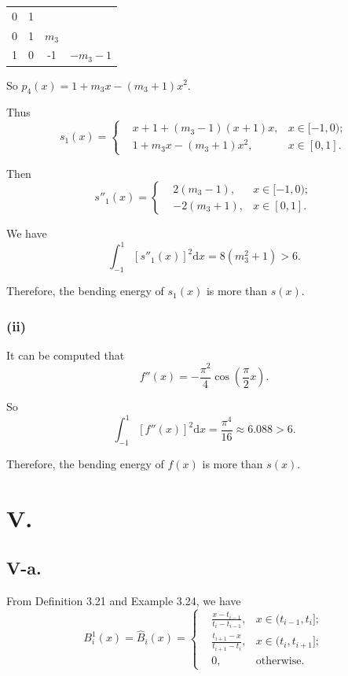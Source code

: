 \documentclass[a4paper]{article}
\begin{document}
\begin{table}[H]
  \centering
  \begin{tabular}{c|ccc}
    0 & 1 & &  \\
    0 & 1 & $m_3$ &   \\
    1 & 0 & -1 & $-m_3-1$  \\
  \end{tabular}
\end{table}

So $p_4(x)=1+m_{3}x-(m_3+1)x^2$.

Thus 
$$
s_1(x)=
\left\{
\begin{aligned}
  &x+1+(m_3-1)(x+1)x, &x\in [-1,0);\\
  &1+m_{3}x-(m_3+1)x^2, &x\in [0,1].
\end{aligned}
\right.
$$

Then
$$
s''_1(x)=
\left\{
\begin{aligned}
  &2(m_3-1), &x\in [-1,0);\\
  &-2(m_3+1), &x\in [0,1].
\end{aligned}
\right.
$$

We have 
$$
\int_{-1}^{1}[s''_1(x)]^2 \mathrm{d}x=8(m_3^2+1)>6.
$$

Therefore, the bending energy of $s_1(x)$ is more than $s(x)$.

\subsubsection*{(ii)}
It can be computed that $$f''(x)=-\frac{\pi^2}{4}\cos(\frac{\pi}{2}x).$$

So $$\int_{-1}^{1}[f''(x)]^2 \mathrm{d}x=\frac{\pi^4}{16}\approx6.088>6.$$

Therefore, the bending energy of $f(x)$ is more than $s(x)$.

\section*{V.}
\subsection*{V-a.}
From Definition 3.21 and Example 3.24, we have
$$
B^1_i(x)=\hat{B}_i(x)=
\left\{
\begin{aligned}
  &\frac{x-t_{i-1}}{t_i-t_{i-1}}, &x\in (t_{i-1},t_i];\\
  &\frac{t_{i+1}-x}{t_{i+1}-t_{i}}, &x\in (t_i,t_{i+1}]; \\
  &0, &\text{otherwise}.
\end{aligned}
\right.
$$
\end{document}
